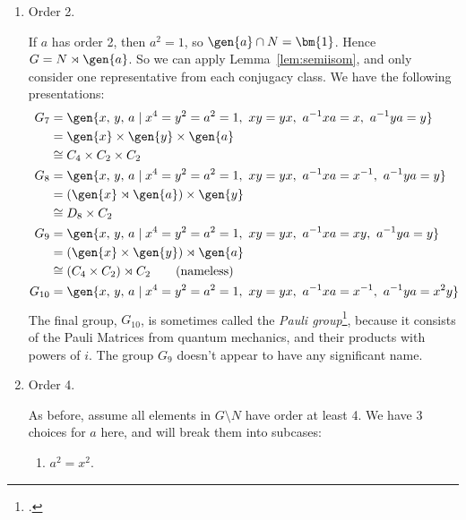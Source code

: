 \begin{enumerate}
    \item Order 2.

        If \(a\) has order 2, then \(a^2 = 1\), so \(\gen{a} \cap N = \bm{1}\).
        Hence \(G = N \rtimes \gen{a}\).
        So we can apply Lemma~\ref{lem:semiisom}, and only consider one representative from each conjugacy class.
        We have the following presentations:
        \begin{align*}
            G_7 &= \gen{x,\,y,\,a \mid x^4 = y^2 = a^2 = 1,\ xy = yx,\ a^{-1}xa = x,\ a^{-1}ya = y} \\
                &= \gen{x} \times \gen{y} \times \gen{a} \\
                &\cong C_4 \times C_2 \times C_2 \\
            G_8 &= \gen{x,\,y,\,a \mid x^4 = y^2 = a^2 = 1,\ xy = yx,\ a^{-1}xa = x^{-1},\ a^{-1}ya = y} \\
                &= (\gen{x} \rtimes \gen{a}) \times \gen{y} \\
                &\cong D_8 \times C_2 \\
            G_9 &= \gen{x,\,y,\,a \mid x^4 = y^2 = a^2 = 1,\ xy = yx,\ a^{-1}xa = xy,\ a^{-1}ya = y} \\
                &= (\gen{x} \times \gen{y}) \rtimes \gen{a} \\
                &\cong (C_4 \times C_2) \rtimes C_2 \tag{nameless} \\
            G_{10} &= \gen{x,\,y,\,a \mid x^4 = y^2 = a^2 = 1,\ xy = yx,\ a^{-1}xa = x^{-1},\ a^{-1}ya = x^2 y}\\
        \end{align*}
        The final group, \(G_{10}\), is sometimes called the \emph{Pauli group}\footcite{order16names}, because it
        consists of the Pauli Matrices from quantum mechanics, and their products with powers of \(i\).
        The group \(G_9\) doesn't appear to have any significant name.

    \item Order 4.

        As before, assume all elements in \(G\setminus N\) have order at least 4.
        We have 3 choices for \(a\) here, and will break them into subcases:
        \begin{enumerate}[\bfseries A:]
            \item \(a^2 = x^2\).


\end{enumerate}
\end{enumerate}
